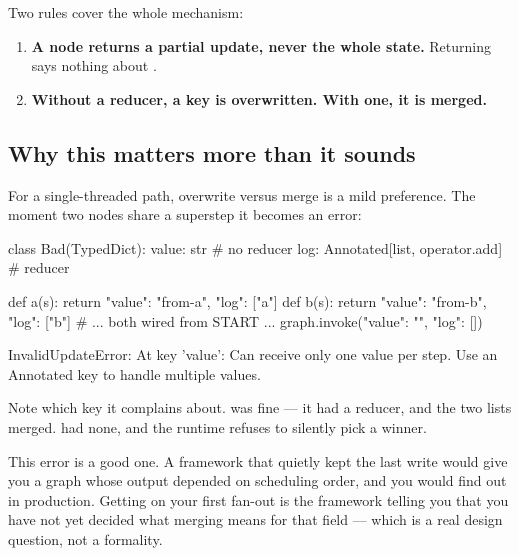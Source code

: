 Two rules cover the whole mechanism:

\begin{enumerate}[leftmargin=1.4em]
\item \textbf{A node returns a partial update, never the whole state.} Returning
       says nothing about .
\item \textbf{Without a reducer, a key is overwritten. With one, it is merged.}
\end{enumerate}

\subsection{Why this matters more than it sounds}
\label{sec:parallel-write}

For a single-threaded path, overwrite versus merge is a mild preference. The
moment two nodes share a superstep it becomes an error:

\begin{python}[caption={Two nodes, one unreduced key}, label={lst:invalid-update}]
class Bad(TypedDict):
    value: str                                   # no reducer
    log: Annotated[list, operator.add]           # reducer


def a(s): return {"value": "from-a", "log": ["a"]}
def b(s): return {"value": "from-b", "log": ["b"]}
# ... both wired from START ...
graph.invoke({"value": "", "log": []})
\end{python}

\begin{console}
InvalidUpdateError: At key 'value': Can receive only one value per step.
Use an Annotated key to handle multiple values.
\end{console}

Note which key it complains about.  was fine --- it had a reducer, and
the two lists merged.  had none, and the runtime refuses to silently
pick a winner.


\begin{note}
This error is a good one. A framework that quietly kept the last write would give
you a graph whose output depended on scheduling order, and you would find out in
production. Getting  on your first fan-out is the
framework telling you that you have not yet decided what merging means for that
field --- which is a real design question, not a formality.
\end{note}

